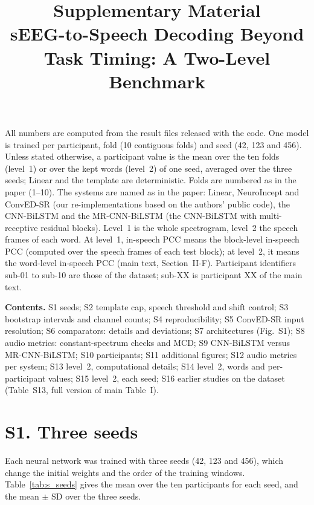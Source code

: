 \documentclass[10pt,a4paper]{article}
\title{Supplementary Material\\[2pt]\large sEEG-to-Speech Decoding Beyond Task Timing: A Two-Level Benchmark}
\author{}\date{}
\begin{document}
\maketitle
\noindent All numbers are computed from the result files released with the code. One model is trained per participant, fold (10 contiguous folds) and seed (42, 123 and 456). Unless stated otherwise, a participant value is the mean over the ten folds (level~1) or over the kept words (level~2) of one seed, averaged over the three seeds; Linear and the template are deterministic. Folds are numbered as in the paper (1--10). The systems are named as in the paper: Linear, NeuroIncept and ConvED-SR (our re-implementations based on the authors' public code), the CNN-BiLSTM and the MR-CNN-BiLSTM (the CNN-BiLSTM with multi-receptive residual blocks). Level~1 is the whole spectrogram, level~2 the speech frames of each word. At level~1, in-speech PCC means the block-level in-speech PCC (computed over the speech frames of each test block); at level~2, it means the word-level in-speech PCC (main text, Section~II-F). Participant identifiers sub-01 to sub-10 are those of the dataset; sub-XX is participant XX of the main text.\par
\smallskip\noindent\textbf{Contents.} S1 seeds; S2 template cap, speech threshold and shift control; S3 bootstrap intervals and channel counts; S4 reproducibility; S5 ConvED-SR input resolution; S6 comparators: details and deviations; S7 architectures (Fig.~S1); S8 audio metrics: constant-spectrum checks and MCD; S9 CNN-BiLSTM versus MR-CNN-BiLSTM; S10 participants; S11 additional figures; S12 audio metrics per system; S13 level~2, computational details; S14 level~2, words and per-participant values; S15 level~2, each seed; S16 earlier studies on the dataset (Table~S13, full version of main Table~I).\par

\section*{S1. Three seeds}
Each neural network was trained with three seeds (42, 123 and 456), which change the initial weights and the order of the training windows. Table~\ref{tab:s_seeds} gives the mean over the ten participants for each seed, and the mean $\pm$ SD over the three seeds.
\end{document}
